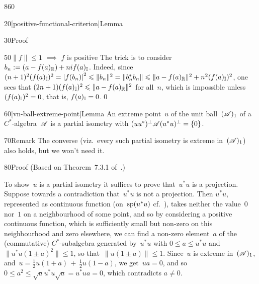 \begin{parsec}{860}
\begin{point}{20}[positive-functional-criterion]{Lemma}
\begin{point}{30}{Proof}
\begin{point}{50}{$\|f\|\leq 1$ $\implies$ $f$ is positive}
The trick is to consider $b_n := (a - f(a)_{\mathbb{R}})+nif(a)_{\mathbb{I}}$.
Indeed, since $(n+1)^2(f(a)_{\mathbb{I}})^2
= \left|f(b_n)\right|^2 \leqslant \|b_n\|^2 = 
\|b_n^*b_n\| \leqslant \|a-f(a)_{\mathbb{R}}\|^2 + n^2(f(a)_{\mathbb{I}})^2$,
one sees that $(2n+1)(f(a)_{\mathbb{I}})^2\leqslant \|a-f(a)_{\mathbb{R}}\|^2$
for all~$n$,
which is impossible unless~$(f(a)_{\mathbb{I}})^2=0$,
that is, $f(a)_{\mathbb{I}}=0$.\qed
\end{point}
\end{point}
\end{point}
\begin{point}{60}[vn-ball-extreme-point]{Lemma}%
%
An extreme point~$u$ of the unit ball~$(\mathscr{A})_1$
of a $C^*$-algebra~$\mathscr{A}$
is a partial isometry with $(uu^*)^\perp\mathscr{A}(u^*u)^\perp = \{0\}$.
\begin{point}{70}{Remark}%
The converse (viz.~every such partial isometry
is extreme in~$(\mathscr{A})_1$)
also holds, but we won't need it.
\end{point}
\begin{point}{80}{Proof}%
(Based on Theorem~7.3.1 of~\cite{kr}.)

To show~$u$ is a partial isometry
it suffices to prove that~$u^*u$ is a projection.
Suppose towards a contradiction that~$u^*u$ is not a projection.
Then $u^*u$,
represented
as continuous function (on~$\mathrm{sp}(u^*u)$ cf.~),
takes neither the value~$0$ nor~$1$ on a neighbourhood
of some point,
and so by considering a
positive continuous function,
which is sufficiently small but non-zero on this neighbourhood
and zero elsewhere, 
we can find a non-zero element~$a$ 
of the (commutative) $C^*$-subalgebra generated by~$u^*u$
with $0\leq a\leq u^*u$
and $\|u^*u (1\pm a)^2\|\leq 1$,
so that~$\|u(1\pm a)\|\leq 1$.
Since~$u$ is extreme in~$(\mathscr{A})_1$,
and~$u=\frac{1}{2}u(1+a)\,+\,\frac{1}{2}u(1-a)$,
we get~$ua=0$,
and so $0\leq a^2\leq \sqrt{a}u^*u\sqrt{a}=u^*ua=0$,
which contradicts $a\neq 0$.


\end{point}
\end{point}
\end{parsec}
